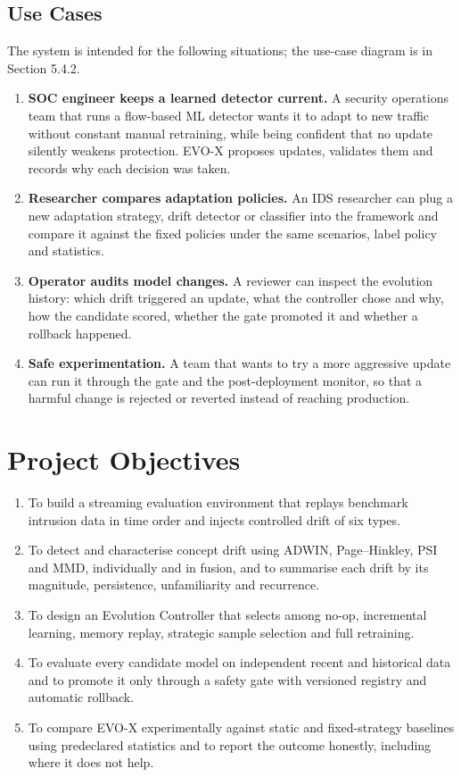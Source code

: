 \documentclass{article}
\begin{document}
\subsection{Use Cases}

The system is intended for the following situations; the use-case diagram is in Section 5.4.2.

\begin{enumerate}
\item \textbf{SOC engineer keeps a learned detector current.} A security operations team that runs a flow-based ML detector wants it to adapt to new traffic without constant manual retraining, while being confident that no update silently weakens protection. EVO-X proposes updates, validates them and records why each decision was taken.
\item \textbf{Researcher compares adaptation policies.} An IDS researcher can plug a new adaptation strategy, drift detector or classifier into the framework and compare it against the fixed policies under the same scenarios, label policy and statistics.
\item \textbf{Operator audits model changes.} A reviewer can inspect the evolution history: which drift triggered an update, what the controller chose and why, how the candidate scored, whether the gate promoted it and whether a rollback happened.
\item \textbf{Safe experimentation.} A team that wants to try a more aggressive update can run it through the gate and the post-deployment monitor, so that a harmful change is rejected or reverted instead of reaching production.
\end{enumerate}

\pagebreak
\section{Project Objectives}

\begin{enumerate}
\item To build a streaming evaluation environment that replays benchmark intrusion data in time order and injects controlled drift of six types.
\item To detect and characterise concept drift using ADWIN, Page--Hinkley, PSI and MMD, individually and in fusion, and to summarise each drift by its magnitude, persistence, unfamiliarity and recurrence.
\item To design an Evolution Controller that selects among no-op, incremental learning, memory replay, strategic sample selection and full retraining.
\item To evaluate every candidate model on independent recent and historical data and to promote it only through a safety gate with versioned registry and automatic rollback.
\item To compare EVO-X experimentally against static and fixed-strategy baselines using predeclared statistics and to report the outcome honestly, including where it does not help.
\end{enumerate}
\end{document}

